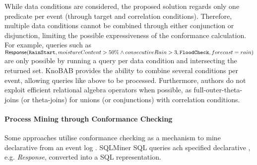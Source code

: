While data conditions are considered, the proposed solution regards only one predicate per event (through target and correlation conditions). Therefore, multiple data conditions cannot be combined through either conjunction or disjunction, limiting the possible expressiveness of the conformance calculation. For example, queries such as 
$\textsf{Response}(\texttt{RainStart},moistureContent\\>50\% \wedge consecutiveRain>3,\texttt{FloodCheck},forecast=rain)$ 
are only possible by running a query per data condition and intersecting the returned set. KnoBAB provides the ability to combine several conditions per event, allowing queries like above to be processed. Furthermore, authors do not exploit efficient relational algebra operators when possible, as full-outer-theta-joins (or theta-joins) for unions (or conjunctions) with correlation conditions.


\paragraph*{Process Mining through Conformance Checking}
Some approaches utilise conformance checking as a mechanism to mine declarative   from an event log . SQLMiner \cite{SchonigRCJM16}  SQL queries \cite{Schonig15} ach specified declarative , e.g. \emph{Response},  converted into a SQL representation.  

